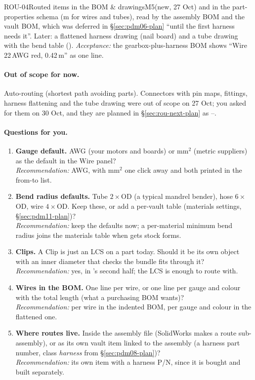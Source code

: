 \begin{epic}{ROU-04}{Routed items in the BOM \& drawings}{M5}{\stDone}{(new, 27 Oct)}
 and  in the part-properties schema (m for wires and tubes), read by the
assembly BOM and the vault BOM, which was deferred in \S\ref{sec:pdm06-plan} ``until the first harness needs it''.
Later: a flattened harness drawing (nail board) and a tube drawing with the bend table ().
\emph{Acceptance:} the gearbox-plus-harness BOM shows ``Wire 22\,AWG red, 0.42\,m'' as one line.
\end{epic}

\paragraph{Out of scope for now.} Auto-routing (shortest path avoiding parts). Connectors with pin maps,
fittings, harness flattening and the tube drawing were out of scope on 27 Oct; you asked for them on 30 Oct, and
they are planned in \S\ref{sec:rou-next-plan} as --.

\paragraph{Questions for you.}
\begin{enumerate}[label=R\arabic*.]
  \item \textbf{Gauge default.} AWG (your motors and boards) or mm$^2$ (metric suppliers) as the default in the
        Wire panel?\\
        \emph{Recommendation:} AWG, with mm$^2$ one click away and both printed in the from-to list.
  \item \textbf{Bend radius defaults.} Tube $2\times$OD (a typical mandrel bender), hose $6\times$OD, wire
        $4\times$OD. Keep these, or add a per-vault table (materials settings, \S\ref{sec:pdm11-plan})?\\
        \emph{Recommendation:} keep the defaults now; a per-material minimum bend radius joins the materials table
        when  gets stock forms.
  \item \textbf{Clips.} A Clip is just an LCS on a part today. Should it be its own object with an inner diameter
        that checks the bundle fits through it?\\
        \emph{Recommendation:} yes, in 's second half; the LCS is enough to route with.
  \item \textbf{Wires in the BOM.} One line per wire, or one line per gauge and colour with the total length
        (what a purchasing BOM wants)?\\
        \emph{Recommendation:} per wire in the indented BOM, per gauge and colour in the flattened one.
  \item \textbf{Where routes live.} Inside the assembly file (SolidWorks makes a route sub-assembly), or as its own
        vault item linked to the assembly (a harness part number, class \emph{harness} from \S\ref{sec:pdm08-plan})?\\
        \emph{Recommendation:} its own item with a harness P/N, since it is bought and built separately.
\end{enumerate}

